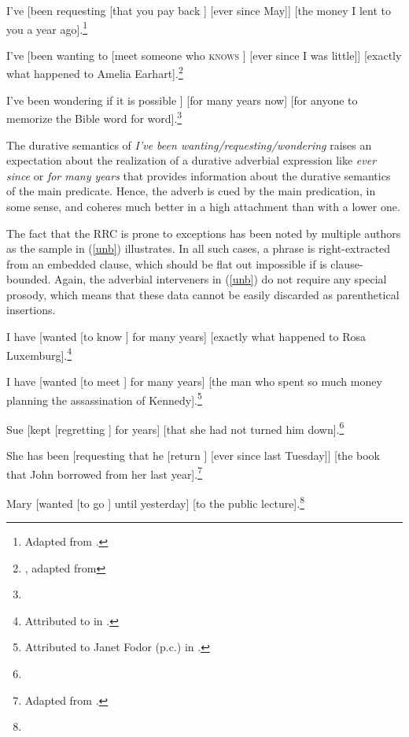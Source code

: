 \documentclass[output=paper
 	        ,biblatex
                ,babelshorthands
                ,newtxmath
                ,draftmode
                ,colorlinks, citecolor=brown
]{langscibook}
\begin{document}
\eal \label{longb}
\ex  I've [been requesting [that you pay back \spc] [ever since May]] [the money
I lent to you a year ago].\footnote{
  Adapted from .
}

\ex I've [been wanting to [meet someone who \textsc{knows} \spc] [ever since I was little]] [exactly what happened to Amelia
Earhart].\footnote{
  , adapted from 
}

\ex  I've been wondering  if it is possible   \spc]
[for many years now] [for anyone to memorize the Bible word for word].\footnote{
}
\zl


\noindent
The durative semantics of \emph{I've been wanting/requesting/wondering} raises an expectation about
the realization of a durative adverbial expression like \emph{ever since} or \emph{for many years}
that provides information about the durative semantics of the main predicate.  Hence, the adverb is
cued by the main predication, in some sense, and coheres much better in a high attachment than with
a lower one.

The fact that the RRC is prone to exceptions has been noted by multiple authors as the sample in
(\ref{unb}) illustrates. In all such cases, a phrase is right-extracted from an embedded clause,
which should be flat out impossible if  is clause-bounded. Again, the adverbial
interveners in (\ref{unb}) do not require any special prosody, which means that these data cannot be
easily discarded as parenthetical insertions.
  
\eal \label{unb}
\ex I have  [wanted [to know \spc] for many years] [exactly what happened to Rosa Luxemburg].\footnote{
Attributed to  in .}

\ex I have  [wanted [to meet \spc] for many years] [the man who spent so much money planning the assassination of Kennedy].\footnote{
Attributed to Janet Fodor (p.c.) in .}

\ex Sue [kept [regretting \spc] for years] [that she had not turned
him down].\footnote{
}

\ex She has been [requesting that he [return \spc] [ever since last Tuesday]] [the book
that John borrowed from her last year].\footnote{
Adapted from .
}

\ex  Mary [wanted [to go \spc] until yesterday]  [to the public lecture].\footnote{}
\zl
\end{document}
